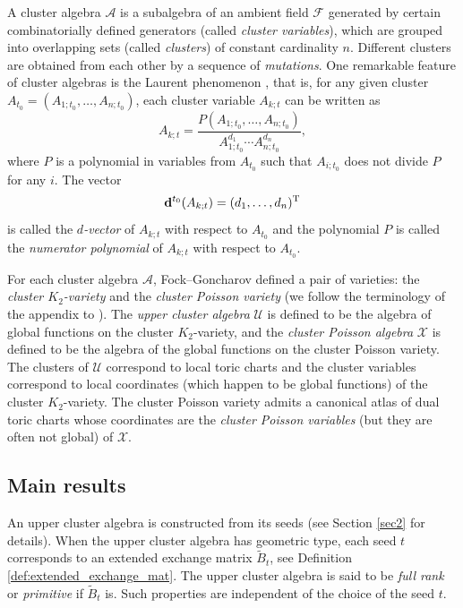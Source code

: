 \documentclass{amsart}
\theoremstyle{definition}
\theoremstyle{remark}
\numberwithin{equation}{section}
\begin{document}
A cluster algebra $\mathcal A$  is a subalgebra of an ambient field $\mathcal F$ generated by certain combinatorially defined generators (called {\em cluster variables}), which are grouped into overlapping sets (called {\em clusters}) of constant cardinality $n$.   Different clusters are obtained from each other by a sequence of {\em mutations}.  One remarkable feature of cluster algebras
is the Laurent phenomenon \cite{FZ}, that is,  for any given cluster $A_{t_0}=(A_{1;t_0},\ldots,A_{n;t_0})$, each cluster variable $A_{k;t}$  can be written as
 $$A_{k;t}=\frac{P(A_{1;t_0},\ldots,A_{n;t_0})}{A_{1;t_0}^{d_1}\cdots A_{n;t_0}^{d_n}},$$
where $P$ is a polynomial in variables from $A_{t_0}$ such that  $A_{i;t_0}$ does not divide $P$ for any $i$.  The vector $${\bf d}^{t_0}(A_{k;t})=(d_1,\ldots,d_n)^{\rm T}$$ is called  the
 {\em $d$-vector} of $A_{k;t}$ with respect to $A_{t_0}$ and the polynomial $P$ is called the {\em numerator polynomial} of $A_{k;t}$ with respect to $A_{t_0}$.


For each cluster algebra $\mathcal A$,  Fock--Goncharov  defined  \cite{FG0} a pair of varieties: the
{\em cluster $K_2$-variety} and the {\em cluster Poisson variety} (we follow the terminology of the appendix
to \cite{ShenWeng18}). The {\em upper cluster algebra} $\mathcal U$ is defined to be
the algebra of global functions on the cluster $K_2$-variety, and the {\em cluster Poisson algebra} $\mathcal X$ is defined to be  the algebra of the global functions on the cluster Poisson variety. The clusters of $\mathcal U$ correspond to local toric charts and the cluster variables correspond to local
coordinates (which happen to be global functions) of the cluster $K_2$-variety.  The  cluster Poisson variety
admits a canonical atlas of dual toric charts whose coordinates are the {\em cluster
Poisson variables} (but they are often not global) of $\mathcal X$.

\subsection{Main results}

An upper cluster algebra is constructed from its seeds (see Section \ref{sec2} for details). When the upper cluster algebra has geometric type, each seed $t$ corresponds to an extended exchange matrix $\widetilde{B}_t$, see Definition \ref{def:extended_exchange_mat}. The upper cluster algebra is said to be {\em full rank} or {\em primitive} if $\widetilde{B}_t$ is. Such properties are independent of the choice of the seed $t$.
\end{document}
